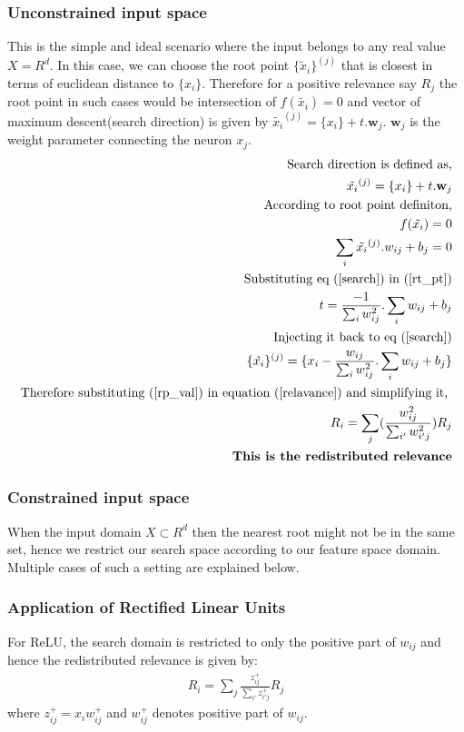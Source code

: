 \documentclass{article}
\begin{document}
	\subsubsection{Unconstrained input space}
	This is the simple and ideal scenario where the input belongs to any real value $X = R^d$. In this case, we can choose the root point $\{ \tilde{x}_i\}^{(j)}$ that is closest in terms of euclidean distance to $\{x_i\}$. Therefore for a positive relevance say $R_j$ the root point in such cases would be intersection of $f(\tilde{x_i}) = 0$ and vector of maximum descent(search direction) is given by $\tilde{x_i}^{(j)} = \{x_i\} + t.\textbf{w}_j$. $\textbf{w}_j$ is the weight parameter connecting the neuron $x_j$.
	\begin{align}
	    \text{Search direction is defined as,} \nonumber \\ \label{search}
		\tilde{x_i}^{(j)} = \{x_i\} + t.\textbf{w}_j  \\
		\text{According to root point definiton,}  \nonumber \\
		f(\tilde{x_i}) = 0   \nonumber \\
		\sum_{i} \tilde{x_i}^{(j)}.w_{ij} + b_j = 0  \label{rt_pt} \\
		\text{Substituting eq (\ref{search}) in  (\ref{rt_pt})}  \nonumber \\
		t = \frac{-1}{\sum_{i} w_{ij}^{2}} . \sum_{i} w_{ij} +b_{j} \nonumber \\
		\text{Injecting it back to eq (\ref{search})} \nonumber \\
		\{\tilde{x_i} \}^{(j)} = \{x_i -  \frac{w_{ij}}{\sum_{i} w_{ij}^{2}} . \sum_{i} w_{ij} +b_{j}  \} \label{rp_val} \\ 
		\text{Therefore substituting (\ref{rp_val}) in equation (\ref{relavance}) and simplifying it,  } \nonumber \\
		R_i = \sum_j (\frac{w_{ij}^{2}}{\sum_{i'} w_{i'j}^2}) R_j  \\
		\textbf{This is the redistributed relevance} \nonumber		
	\end{align}
	\subsubsection{Constrained input space}
	When the input domain $X \subset R^d$ then the nearest root might not be in the same set, hence we restrict our search space according to our feature space domain. Multiple cases of such a setting are explained below.
	\subsubsection*{Application of Rectified Linear Units}
	For ReLU, the search domain is restricted to only the positive part of $w_{ij}$ and hence the redistributed relevance is given by:
	\begin{align}
		R_i = \sum_{j} \frac{z_{ij}^{+}}{\sum_{i'}z_{i'j}^{+}} R_j
	\end{align}
	where $z_{ij}^{+} = x_iw_{ij}^{+}$ and $w_{ij}^{+}$ denotes positive part of $w_{ij}$.
\end{document}
